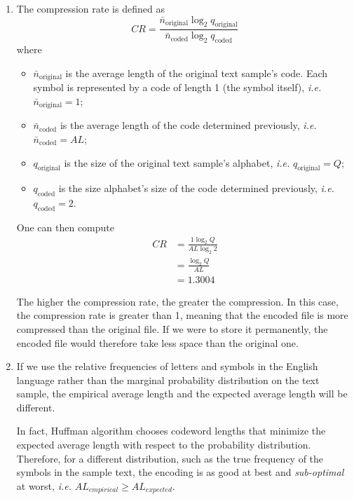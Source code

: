 \documentclass[a4paper, 12pt]{article}
\begin{document}
\begin{enumerate}[leftmargin=*]
        
        \item The compression rate is defined as
        \begin{equation}
            CR = \frac{\bar{n}_{\text{original}}\log_2 q_{\text{original}}}{\bar{n}_{\text{coded}}\log_2 q_{\text{coded}}}
        \end{equation}
        where
        
        \begin{itemize}
            \item $\bar{n}_{\text{original}}$ is the average length of the original text sample's code. Each symbol is represented by a code of length 1 (the symbol itself), \emph{i.e.} $\bar{n}_{\text{original}} = 1$;
            \item $\bar{n}_{\text{coded}}$ is the average length of the code determined previously, \emph{i.e.} $\bar{n}_{\text{coded}} = AL$;
            \item $q_{\text{original}}$ is the size of the original text sample's alphabet, \emph{i.e.} $q_{\text{original}} = Q$;
            \item $q_{\text{coded}}$ is the size alphabet's size of the code determined previously, \emph{i.e.} $q_{\text{coded}} = 2$.
        \end{itemize}
        
        One can then compute
        \begin{align*}
            CR & = \frac{1\log_2 Q}{AL\log_2 2} \\
            & = \frac{\log_2 Q}{AL} \\
            & = \num{1.3004}
        \end{align*}
        
        The higher the compression rate, the greater the compression. In this case, the compression rate is greater than 1, meaning that the encoded file is more compressed than the original file. If we were to store it permanently, the encoded file would therefore take less space than the original one.
        
        
        \item If we use the relative frequencies of letters and symbols in the English language rather than the marginal probability distribution on the text sample, the empirical average length and the expected average length will be different.
        
        In fact, Huffman algorithm chooses codeword lengths that minimize the expected average length with respect to the probability distribution. Therefore, for a different distribution, such as the true frequency of the symbols in the sample text, the encoding is as good at best and \emph{sub-optimal} at worst, \emph{i.e.} $AL_{empirical} \geq AL_{expected}$.
        

\end{enumerate}
\end{document}

